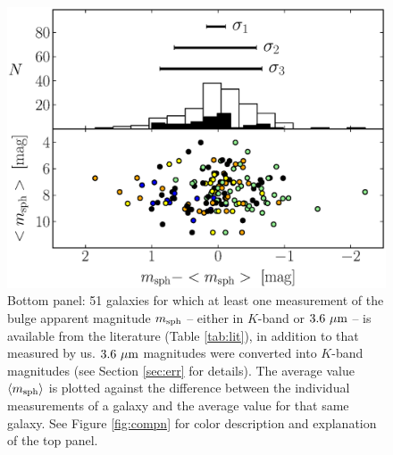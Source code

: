 \documentclass[preprint2]{emulateapj}
\begin{document}
\begin{figure}%
\begin{center}
\includegraphics[width=1.1\columnwidth]{images/comparison_all_mag_sph.eps} 
\caption{Bottom panel: 51 galaxies for which at least one measurement of the bulge apparent magnitude $m_{\rm sph}$ 
-- either in $K$-band or $3.6~\rm \mu m$ -- is available from the literature (Table \ref{tab:lit}), in addition to that measured by us. 
$3.6~\rm \mu m$ magnitudes were converted into $K$-band magnitudes (see Section \ref{sec:err} for details).
The average value $\langle m_{\rm sph} \rangle$ is plotted against 
the difference between the individual measurements of a galaxy 
and the average value for that same galaxy.
See Figure \ref{fig:compn} for color description and explanation of the top panel.}
\label{fig:compmag}
\end{center}
\end{figure}
\end{document}
